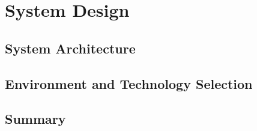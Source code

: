 \chapter{System Design}
\label{ch:design}

\section{System Architecture}

\section{Environment and Technology Selection}

\section{Summary}
